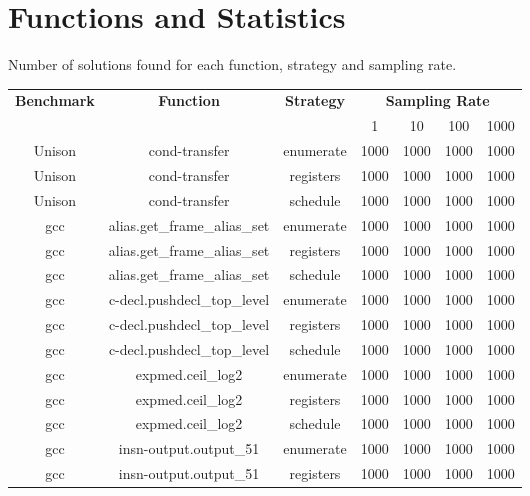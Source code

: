 
\section{Functions and Statistics}

Number of solutions found for each function, strategy and sampling rate.

\begin{center}
	\begingroup
	\scriptsize
	\setlength{\LTleft}{-20cm plus -1fill}
	\setlength{\LTright}{\LTleft}
	\begin{longtable}{c|c|c|c|c|c|c}
		\multirow{2}{*}{\textbf{Benchmark}} & \multirow{2}{*}{\textbf{Function}} & \multirow{2}{*}{\textbf{Strategy}} & \multicolumn{4}{c}{\textbf{Sampling Rate}} \\
		\cline{4-7}
		& & & 1 & 10 & 100 & 1000 \\ \hline
		\endhead
		Unison & cond-transfer & enumerate & 1000 & 1000 & 1000 & 1000 \\
		Unison & cond-transfer & registers & 1000 & 1000 & 1000 & 1000 \\
		Unison & cond-transfer & schedule & 1000 & 1000 & 1000 & 1000 \\
		\hline
		gcc & alias.get\_frame\_alias\_set & enumerate & 1000 & 1000 & 1000 & 1000 \\
		gcc & alias.get\_frame\_alias\_set & registers & 1000 & 1000 & 1000 & 1000 \\
		gcc & alias.get\_frame\_alias\_set & schedule & 1000 & 1000 & 1000 & 1000 \\
		\hline
		gcc & c-decl.pushdecl\_top\_level & enumerate & 1000 & 1000 & 1000 & 1000 \\
		gcc & c-decl.pushdecl\_top\_level & registers & 1000 & 1000 & 1000 & 1000 \\
		gcc & c-decl.pushdecl\_top\_level & schedule & 1000 & 1000 & 1000 & 1000 \\
		\hline
		gcc & expmed.ceil\_log2 & enumerate & 1000 & 1000 & 1000 & 1000 \\
		gcc & expmed.ceil\_log2 & registers & 1000 & 1000 & 1000 & 1000 \\
		gcc & expmed.ceil\_log2 & schedule & 1000 & 1000 & 1000 & 1000 \\
		\hline
		gcc & insn-output.output\_51 & enumerate & 1000 & 1000 & 1000 & 1000 \\
		gcc & insn-output.output\_51 & registers & 1000 & 1000 & 1000 & 1000 \\

\end{longtable}
\end{center}
